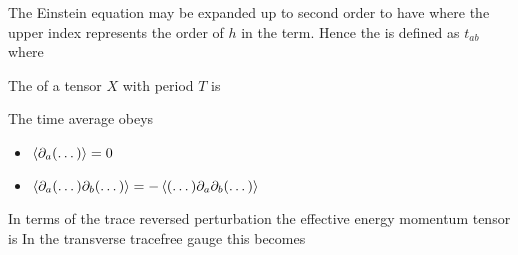 \documentclass{article}
\begin{document}
\begin{definition}
The Einstein equation may be expanded up to second order to have 
where the upper index represents the order of $h$ in the term. Hence the  is defined as $t_{ab}$ where
\end{definition}



\begin{definition}
The  of a tensor $X$ with period $T$ is 
\end{definition}

\begin{lemma}
The time average obeys 
\begin{itemize}
    \item $\braket{\partial_a (\dots)} = 0 $
    \item $\braket{\partial_a(\dots)\partial_b(\dots)} = -\braket{(\dots)\partial_a\partial_b (\dots)}$
\end{itemize}
\end{lemma}

\begin{lemma}
In terms of the trace reversed perturbation the effective energy momentum tensor is 
In the transverse tracefree gauge this becomes 
\end{lemma}
\end{document}
